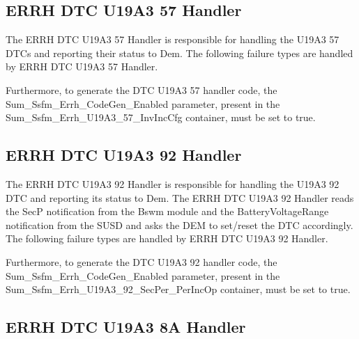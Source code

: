 {      }


\subsection{ERRH DTC U19A3 57 Handler}
\label{subsec:ERRH_DTC_U19A3_57}

The ERRH DTC U19A3 57 Handler is responsible for handling the U19A3 57 DTCs and reporting their status to Dem.
The following failure types are handled by ERRH DTC U19A3 57 Handler. 
{
    
}

Furthermore, to generate the DTC U19A3 57 handler code, the Sum_Ssfm_Errh_CodeGen_Enabled parameter, present in the Sum_Ssfm_Errh_U19A3_57_InvIncCfg container, must be set to true. 

{ }


\subsection{ERRH DTC U19A3 92 Handler}
\label{subsec:ERRH_DTC_U19A3_92}

The ERRH DTC U19A3 92 Handler is responsible for handling the U19A3 92 DTC and reporting its status to Dem.
The ERRH DTC U19A3 92 Handler reads the SecP notification from the Bswm module and the BatteryVoltageRange notification from the SUSD and asks the DEM to set/reset the DTC accordingly.
The following failure types are handled by ERRH DTC U19A3 92 Handler.
{
    
}


Furthermore, to generate the DTC  U19A3 92 handler code, the Sum_Ssfm_Errh_CodeGen_Enabled parameter, present in the Sum_Ssfm_Errh_U19A3_92_SecPer_PerIncOp container, must be set to true. 

{      }

\subsection{ERRH DTC U19A3 8A Handler}
\label{subsec:ERRH_DTC_U19A3_8A}


